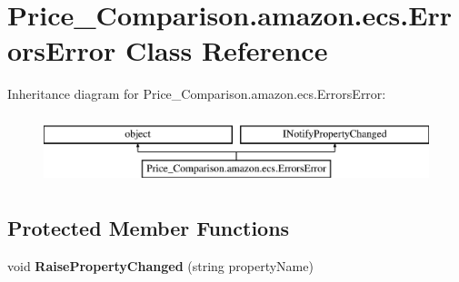 \hypertarget{class_price___comparison_1_1amazon_1_1ecs_1_1_errors_error}{\section{Price\-\_\-\-Comparison.\-amazon.\-ecs.\-Errors\-Error Class Reference}
\label{class_price___comparison_1_1amazon_1_1ecs_1_1_errors_error}
}


 


Inheritance diagram for Price\-\_\-\-Comparison.\-amazon.\-ecs.\-Errors\-Error\-:\begin{figure}[H]
\begin{center}
\leavevmode
\includegraphics[height=2.000000cm]{class_price___comparison_1_1amazon_1_1ecs_1_1_errors_error}
\end{center}
\end{figure}
\subsection*{Protected Member Functions}
\begin{DoxyCompactItemize}
\item 
\hypertarget{class_price___comparison_1_1amazon_1_1ecs_1_1_errors_error_a483dd0d0770a7fb3bbcfa6a7c7629985}{void {\bfseries Raise\-Property\-Changed} (string property\-Name)}\label{class_price___comparison_1_1amazon_1_1ecs_1_1_errors_error_a483dd0d0770a7fb3bbcfa6a7c7629985}

\end{DoxyCompactItemize}
